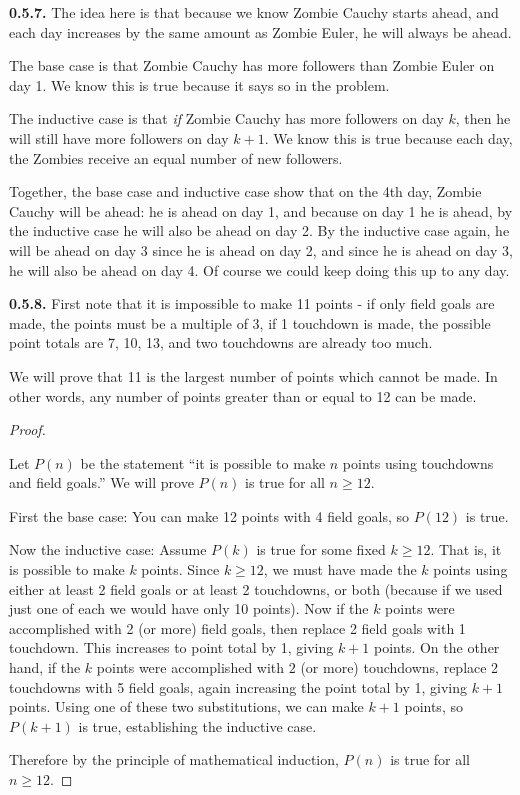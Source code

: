 \documentclass[10pt,]{book}
\theoremstyle{plain}
\theoremstyle{definition}
\theoremstyle{definition}
\theoremstyle{definition}
\theoremstyle{definition}
\numberwithin{equation}{chapter}
\begin{document}
\par\smallskip
\noindent\textbf{0.5.7.} \hypertarget{p-456}{}%
The idea here is that because we know Zombie Cauchy starts ahead, and each day increases by the same amount as Zombie Euler, he will always be ahead.%
\par
\hypertarget{p-457}{}%
The base case is that Zombie Cauchy has more followers than Zombie Euler on day 1. We know this is true because it says so in the problem.%
\par
\hypertarget{p-458}{}%
The inductive case is that \emph{if} Zombie Cauchy has more followers on day \(k\), then he will still have more followers on day \(k+1\). We know this is true because each day, the Zombies receive an equal number of new followers.%
\par
\hypertarget{p-459}{}%
Together, the base case and inductive case show that on the 4th day, Zombie Cauchy will be ahead: he is ahead on day 1, and because on day 1 he is ahead, by the inductive case he will also be ahead on day 2. By the inductive case again, he will be ahead on day 3 since he is ahead on day 2, and since he is ahead on day 3, he will also be ahead on day 4. Of course we could keep doing this up to any day.%
\par\smallskip
\noindent\textbf{0.5.8.} \hypertarget{p-461}{}%
First note that it is impossible to make 11 points - if only field goals are made, the points must be a multiple of 3, if 1 touchdown is made, the possible point totals are 7, 10, 13, \textellipsis{} and two touchdowns are already too much.%
\par
\hypertarget{p-462}{}%
We will prove that 11 is the largest number of points which cannot be made. In other words, any number of points greater than or equal to 12 can be made.%
\begin{proof}\hypertarget{proof-11}{}
\hypertarget{p-463}{}%
Let \(P(n)\) be the statement ``it is possible to make \(n\) points using touchdowns and field goals.'' We will prove \(P(n)\) is true for all \(n \ge 12\).%
\par
\hypertarget{p-464}{}%
First the base case: You can make 12 points with 4 field goals, so \(P(12)\) is true.%
\par
\hypertarget{p-465}{}%
Now the inductive case: Assume \(P(k)\) is true for some fixed \(k \ge 12\). That is, it is possible to make \(k\) points. Since \(k \ge 12\), we must have made the \(k\) points using either at least 2 field goals or at least 2 touchdowns, or both (because if we used just one of each we would have only 10 points). Now if the \(k\) points were accomplished with 2 (or more) field goals, then replace 2 field goals with 1 touchdown. This increases to point total by 1, giving \(k + 1\) points. On the other hand, if the \(k\) points were accomplished with \(2\) (or more) touchdowns, replace 2 touchdowns with 5 field goals, again increasing the point total by 1, giving \(k+1\) points. Using one of these two substitutions, we can make \(k+1\) points, so \(P(k+1)\) is true, establishing the inductive case.%
\par
\hypertarget{p-466}{}%
Therefore by the principle of mathematical induction, \(P(n)\) is true for all \(n \ge 12\).%
\end{proof}
\end{document}
